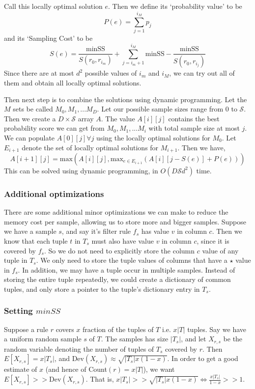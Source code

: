 \documentclass{sig-alternate}
\newcounter{prob}
\begin{document}
Call this locally optimal solution $e$. Then we define its `probability value' to be
$$P(e) = \sum_{j = 1}^{i_M}p_{j}$$
and its `Sampling Cost' to be
$$S(e) = \frac{\text{minSS}}{S(r_0, r_{i_m})} + \sum_{j=i_m+1}^{i_M} \text{minSS} - \frac{\text{minSS}}{S(r_0, r_{i_j})}$$
Since there are at most $d^2$ possible values of $i_m$ and $i_M$, we can try out all of them and obtain all locally optimal solutions. 

Then next step is to combine the solutions using dynamic programming. Let the $M$ sets be called $M_0, M_1, ... M_D$. Let our possible sample sizes range from $0$ to $\mathcal{S}$. Then we create a $D \times \mathcal{S}$ array $A$. The value $A\left[i\right]\left[j\right]$ contains the best probability score we can get from $M_0, M_1, ... M_i$ with total sample size at most $j$. We can populate $A\left[0\right]\left[j\right] \forall j$ using the locally optimal solutions for $M_0$. Let $E_{i+1}$ denote the set of locally optimal solutions for $M_{i+1}$. Then we have,
$$A\left[i+1\right] \left[j \right] = \textrm{max} (A\left[i\right]\left[j\right], \textrm{max}_{e \in E_{i+1}}(A\left[i\right]\left[j-S(e)\right] + P(e)))$$
This can be solved using dynamic programming, in $O(D\mathcal{S}d^2)$ time. 


\subsubsection{Additional optimizations}
There are some additional minor optimizations we can make to reduce the memory cost per sample, allowing us to store more and bigger samples. 
Suppose we have a sample $s$, and say it's filter rule $f_s$ has value $v$ in column $c$. Then we know that each tuple $t$ in $T_s$ must also have value $v$ in column $c$, since it is covered by $f_s$. So we do not need to explicitly store the column $c$ value of any tuple in $T_s$. We only need to store the tuple values of columns that have a $\star$ value in $f_s$.
In addition, we may have a tuple occur in multiple samples. Instead of storing the entire tuple repeatedly, we could create a dictionary of common tuples, and only store a pointer to the tuple's dictionary entry in $T_s$. 

\subsubsection{Setting $minSS$}
Suppose a rule $r$ covers $x$ fraction of the tuples of $T$ i.e. $x|T|$ tuples. Say we have a uniform random sample $s$ of $T$. The samples has size $|T_s|$, and let $X_{r,s}$ be the random variable denoting the number of tuples of $T_s$ covered by $r$. Then $E\left[ X_{r,s} \right] = x|T_s|$, and $\text{Dev}(X_{r,s}) \approx \sqrt{|T_s|x(1-x)}$. In order to get a good estimate of $x$ (and hence of Count$(r) = x|T|$), we want $E\left[X_{r,s}\right] >> \text{Dev}(X_{r,s})$. That is, $x|T_s| >> \sqrt{|T_s|x(1-x)} \Leftrightarrow \frac{x|T_s|}{1-x} >> 1$. 
\end{document}
